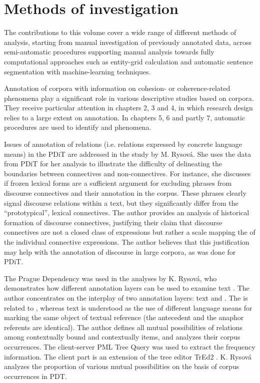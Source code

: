\documentclass[output=paper]{langsci/langscibook.cls}
\begin{document}
	\section{Methods of investigation}
	The contributions to this volume cover a wide range of different methods of analysis, starting from manual investigation of previously annotated data, across semi-automatic procedures supporting manual analysis towards fully computational approaches such as entity-grid calculation and automatic sentence segmentation with machine-learning techniques.
	
	Annotation of corpora with information on cohesion- or coherence-related phenomena play a significant role in various descriptive studies based on corpora. They receive particular attention in chapters 2, 3 and 4, in which research design relies to a large extent on annotation. In chapters 5, 6 and partly 7, automatic procedures are used to identify  and  phenomena.
	
	Issues of annotation of  relations (i.e. relations expressed by concrete language means) in the PDiT are addressed in the study by M. Rysov\'{a}. She uses the data from PDiT for her analysis to illustrate the difficulty of delineating the boundaries between connectives and non-connectives. 
	For instance, she discusses if frozen lexical forms are a sufficient argument for excluding  phrases from discourse connectives and their annotation in the corpus. These phrases clearly signal discourse relations within a text, but they significantly differ from the ``prototypical'', lexical connectives. The author provides an analysis of historical formation of discourse connectives, justifying their claim that discourse connectives are not a closed class of expressions but rather a scale mapping the  of the individual connective expressions. The author believes that this justification may help with the annotation of discourse in large corpora, as was done for PDiT.
	
	The Prague Dependency  was used in the analyses by K. Rysov\'{a}, who demonstrates how different annotation layers can be used to examine text . The author concentrates on the interplay of two annotation layers: text  and . The  is related to , whereas text  is understood as the use of different language means for marking the same object of textual reference (the antecedent and the anaphor referents are identical). The author defines all mutual possibilities of  relations among contextually bound and contextually  items, and analyzes their corpus occurrences. The client-server PML Tree Query \citep{StepanekPajas2010} was used to extract the frequency information. The client part is an extension of the tree editor TrEd2 \citep{PajasStepanek2008}. K. Rysov\'{a} analyzes the proportion of various mutual possibilities on the basis of corpus occurrences in PDT.
	
\end{document}
